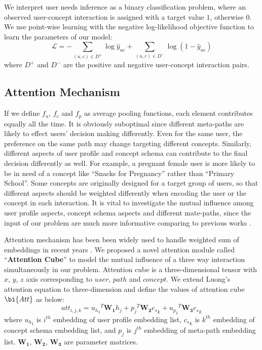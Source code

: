 We interpret user needs inference as a binary classification problem, 
where an observed user-concept interaction is assigned with a target value $1$, otherwise $0$. 
We use point-wise learning with the negative log-likelihood objective function to learn the parameters of our model:
\begin{equation}
\mathscr{L} = -\sum_{(u, c)\in D^+}{\log \hat y_{uc}} + \sum_{(u, c)\in D^-}{\log (1-\hat y_{uc})}
\end{equation}
where $D^+$ and $D^-$ are the positive and negative user-concept interaction pairs.


\subsection{Attention Mechanism}
\label{sec:att}

If we define $f_u$, $f_c$ and $f_p$ as average pooling functions, each element contributes equally all the time.
It is obviously suboptimal since different meta-paths are likely to effect users' decision making differently.
Even for the same user, the preference on the same path may change targeting different concepts.
Similarly, different aspects of user profile and concept schema can contribute to the final decision differently as well.
For example, a pregnant female user is more likely to be in need of a concept like ``Snacks for Pregnancy'' rather than ``Primary School''.
Some concepts are originally designed for a target group of users, so that different aspects should be weighted differently
when encoding the user or the concept in each interaction.
It is vital to investigate the mutual influence among 
user profile aspects, concept schema aspects and different mate-paths,
since the input of our problem are much more informative comparing to previous works \cite{hu2018leveraging,wang2018ripplenet,wang2018explainable}.

Attention mechanism has been been widely used to handle weighted sum of embeddings 
in recent years \cite{bahdanau2014neural,yin2016abcnn}.
We proposed a novel attention module called ``\textbf{Attention Cube}'' to 
model the mutual influence of a three way interaction simultaneously in our problem.
Attention cube is a three-dimensional tensor with $x$, $y$, $z$ axis corresponding to $user$, $path$ and $concept$. 
We extend Luong's attention equation \cite{luong2015effective} to three-dimension and define the values of attention cube $\bi{Att}$ as below:
\begin{equation}
\label{eqn:att}
att_{i,j,k} = {{u_h}_i}^T \bm{W_1} h_j + {p_j}^T \bm{W_2} {c_s}_k + {{u_p}_i}^T \bm{W_3} {c_s}_k  
\end{equation}
where ${u_h}_i$ is $i^{th}$ embedding of user profile embedding list,
 ${c_s}_k$ is $k^{th}$ embedding of concept schema embedding list,
 and $p_j$ is $j^{th}$ embedding of meta-path embedding list.
 $\bm{W_1}$,  $\bm{W_2}$,  $\bm{W_3}$ are parameter matrices.
 
